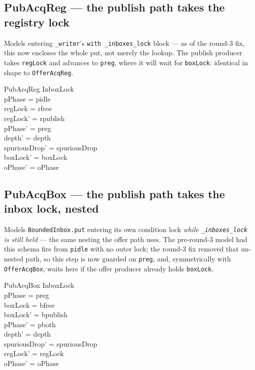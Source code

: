 \documentclass[a4paper,10pt,fleqn]{article}
\begin{document}
\subsection{PubAcqReg --- the publish path takes the registry lock}

Models entering \texttt{\_writer}'s \texttt{with \_inboxes\_lock} block --- as
of the round-3 fix, this now encloses the whole put, not merely the lookup.
The publish producer takes \texttt{regLock} and advances to \texttt{preg},
where it will wait for \texttt{boxLock}: identical in shape to
\texttt{OfferAcqReg}.

\begin{schema}{PubAcqReg}
  \Delta InboxLock \\
\where
  pPhase = pidle \\
  regLock = rfree \\
  regLock' = rpublish \\
  pPhase' = preg \\
  depth' = depth \\
  spuriousDrop' = spuriousDrop \\
  boxLock' = boxLock \\
  oPhase' = oPhase
\end{schema}

\subsection{PubAcqBox --- the publish path takes the inbox lock, nested}

Models \texttt{BoundedInbox.put} entering its own condition lock \emph{while
\texttt{\_inboxes\_lock} is still held} --- the same nesting the offer path
uses. The pre-round-3 model had this schema fire from \texttt{pidle} with no
outer lock; the round-3 fix removed that un-nested path, so this step is now
guarded on \texttt{preg}, and, symmetrically with \texttt{OfferAcqBox}, waits
here if the offer producer already holds \texttt{boxLock}.

\begin{schema}{PubAcqBox}
  \Delta InboxLock \\
\where
  pPhase = preg \\
  boxLock = bfree \\
  boxLock' = bpublish \\
  pPhase' = pboth \\
  depth' = depth \\
  spuriousDrop' = spuriousDrop \\
  regLock' = regLock \\
  oPhase' = oPhase
\end{schema}
\end{document}
